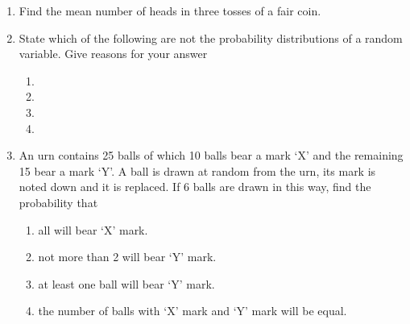 \begin{enumerate}[label=\thechapter.\arabic*,ref=\thechapter.\theenumi]
\begin{align}
  \pr{X} =
    \begin{cases}
      k,  & x=0\\
      2k, & x=1\\
      3k, & x=2\\
      0 , & \text{otherwise}
    \end{cases}       
\end{align}
		\begin{enumerate}
			\item
 Determine the value of $k$ 

\item  Find ,,  
		\end{enumerate}
\solution

\item 
Find the mean number of heads in three tosses of a fair coin.
\\
\solution

\item State which of the following are not the probability distributions of a random 
variable. Give reasons for your answer
\renewcommand{\labelenumii}{\roman{enumii}}
\begin{enumerate}

\item \begin{table}[ht!]\centering

\end{table}

\item \begin{table}[ht!]\centering

\end{table}

\item  \begin{table}[ht!]\centering
	
\end{table}

\item  \begin{table}[ht!]\centering
	
\end{table} 


\end{enumerate}
  \item An urn contains 25 balls of which 10 balls bear a mark `X' and the 
    remaining 15 bear a mark `Y'. A ball is drawn at random from the urn, its 
    mark is noted down and it is replaced. If 6 balls are drawn in this way, 
    find the probability that 
    \begin{enumerate}
        \item all will bear `X' mark. 
        \item not more than 2 will bear `Y' mark. 
        \item at least one ball will bear `Y' mark. 
        \item the number of balls with `X' mark and `Y' mark will be equal.
    \end{enumerate}
\solution



\end{enumerate}
